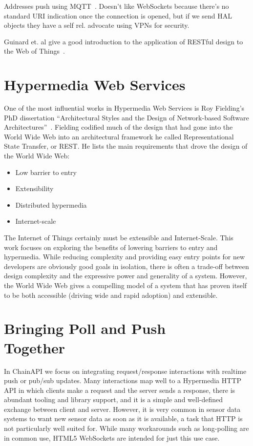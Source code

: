 \documentclass{acm_proc_article-sp}
\newenvironment{tightitemize}{
    \vspace{-10pt}
    \begin{itemize}
        \setlength{\parskip}{-1pt}}{
    \end{itemize}
    \vspace{-10pt}}
\begin{document}
Addresses push using MQTT~\cite{collina2012}. Doesn't like WebSockets because
there’s no standard URI indication once the connection is opened, but if we
send HAL objects they have a self rel. advocate using VPNs for security.

Guinard et. al give a good introduction to the application of RESTful design
to the Web of Things~\cite{guinard2010}.

\section{Hypermedia Web Services}

One of the most influential works in Hypermedia Web Services is Roy Fielding's
PhD dissertation ``Architectural Styles and the Design of Network-based
Software Architectures''~\cite{fielding}. Fielding codified much of the design
that had gone into the World Wide Web into an architectural framework he called
Representational State Transfer, or REST. He lists the main requirements that
drove the design of the World Wide Web:

\begin{tightitemize}
    \item Low barrier to entry
    \item Extensibility
    \item Distributed hypermedia
    \item Internet-scale
\end{tightitemize}

The Internet of Things certainly must be extensible and Internet-Scale. This
work focuses on exploring the benefits of lowering barriers to entry and
hypermedia.  While reducing complexity and providing easy entry points for new
developers are obviously good goals in isolation, there is often a trade-off
between design complexity and the expressive power and generality of a system.
However, the World Wide Web gives a compelling model of a system that has
proven itself to be both accessible (driving wide and rapid adoption) and
extensible.


\section{Bringing Poll and Push\\ Together}

In ChainAPI we focus on integrating request/response interactions with realtime
push or pub/sub updates. Many interactions map well to a Hypermedia HTTP API in
which clients make a request and the server sends a response, there is abundant
tooling and library support, and it is a simple and well-defined exchange
between client and server. However, it is very common in sensor data systems to
want new sensor data as soon as it is available, a task that HTTP is not
particularly well suited for. While many workarounds such as long-polling are
in common use, HTML5 WebSockets are intended for just this use case.
\end{document}
